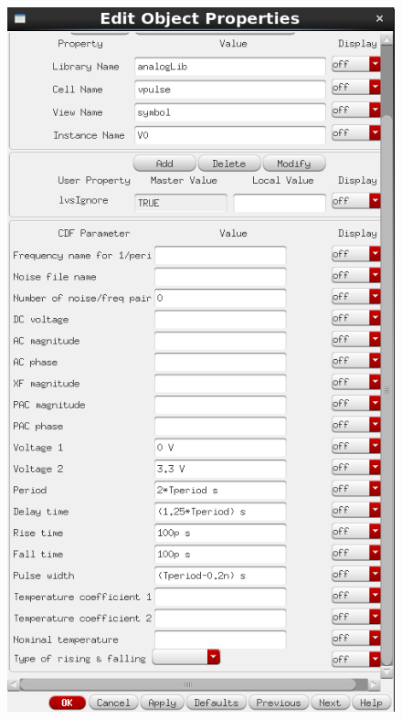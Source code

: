 \begin{figure}[h]
\begin{multicols}{3}
    \includegraphics[width=1\linewidth]{figures/In1Config.PNG}\par 

\end{multicols}
\end{figure}
